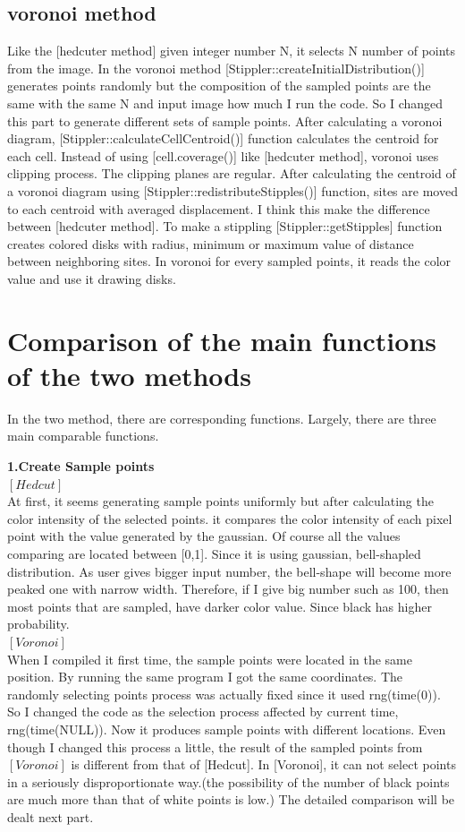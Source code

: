 \documentclass[11pt]{article}
\begin{document}
\subsection{voronoi method}
Like the [hedcuter method] given integer number N, it selects N number of points from the image. In the voronoi method [Stippler::createInitialDistribution()] generates points randomly but the composition of the sampled points are the same with the same N and input image how much I run the code. So I changed this part to generate different sets of sample points. After calculating a voronoi diagram, [Stippler::calculateCellCentroid()] function calculates the centroid for each cell. Instead of using [cell.coverage()] like [hedcuter method], voronoi uses clipping process. The clipping planes are regular. After calculating the centroid of a voronoi diagram using [Stippler::redistributeStipples()] function, sites are moved to each centroid with averaged displacement. I think this make the difference between [hedcuter method]. To make a stippling [Stippler::getStipples] function creates colored disks
with radius, minimum or maximum value of distance between neighboring sites. In voronoi for every sampled points, it reads the color value and use it drawing disks.\\

\section{Comparison of the main functions of the two methods}
In the two method, there are corresponding functions. Largely, there are three main comparable functions.

\textbf{1.Create Sample points}\\
$[Hedcut]$\\
At first, it seems generating sample points uniformly but after calculating the color intensity of the selected points. it compares the color intensity of each pixel point with the value generated by the gaussian. Of course all the values comparing are located between [0,1]. Since it is using gaussian, bell-shapled distribution. As user gives bigger input number, the bell-shape will become more peaked one with narrow width. Therefore, if I give big number such as 100, then most points that are sampled, have darker color value. Since black has higher probability. \\

$[Voronoi]$\\
When I compiled it first time, the sample points were located in the same position. By running the same program I got the same coordinates. The randomly selecting points process was actually fixed since it used rng(time(0)). So I changed the code as the selection process affected by current time, rng(time(NULL)). Now it produces sample points with different locations. Even though I changed this process a little, the result of the sampled points from $[Voronoi]$ is different from that of [Hedcut]. In [Voronoi], it can not select points in a seriously disproportionate way.(the possibility of the number of black points are much more than that of white points is low.) The detailed comparison will be dealt next part.
\end{document}
